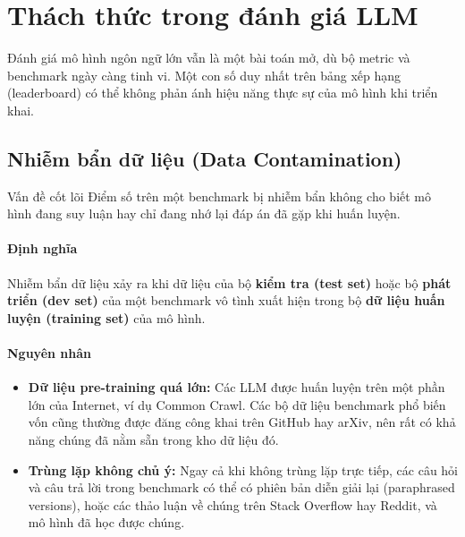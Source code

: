 
\section{Thách thức trong đánh giá LLM}
\label{sec:llm_evaluation_challenges}

Đánh giá mô hình ngôn ngữ lớn vẫn là một bài toán mở, dù bộ metric và benchmark ngày càng tinh vi. Một con số duy nhất trên bảng xếp hạng (leaderboard) có thể không phản ánh hiệu năng thực sự của mô hình khi triển khai.

\subsection{Nhiễm bẩn dữ liệu (Data Contamination)}
\label{ssec:data_contamination}

\begin{pitfall}{Vấn đề cốt lõi}
Điểm số trên một benchmark bị nhiễm bẩn không cho biết mô hình đang suy luận hay chỉ đang nhớ lại đáp án đã gặp khi huấn luyện.
\end{pitfall}

\paragraph{Định nghĩa}
Nhiễm bẩn dữ liệu xảy ra khi dữ liệu của bộ \textbf{kiểm tra (test set)} hoặc bộ \textbf{phát triển (dev set)} của một benchmark vô tình xuất hiện trong bộ \textbf{dữ liệu huấn luyện (training set)} của mô hình.

\paragraph{Nguyên nhân}
\begin{itemize}
    \item \textbf{Dữ liệu pre-training quá lớn:} Các LLM được huấn luyện trên một phần lớn của Internet, ví dụ Common Crawl. Các bộ dữ liệu benchmark phổ biến vốn cũng thường được đăng công khai trên GitHub hay arXiv, nên rất có khả năng chúng đã nằm sẵn trong kho dữ liệu đó.
    \item \textbf{Trùng lặp không chủ ý:} Ngay cả khi không trùng lặp trực tiếp, các câu hỏi và câu trả lời trong benchmark có thể có phiên bản diễn giải lại (paraphrased versions), hoặc các thảo luận về chúng trên Stack Overflow hay Reddit, và mô hình đã học được chúng.
\end{itemize}

